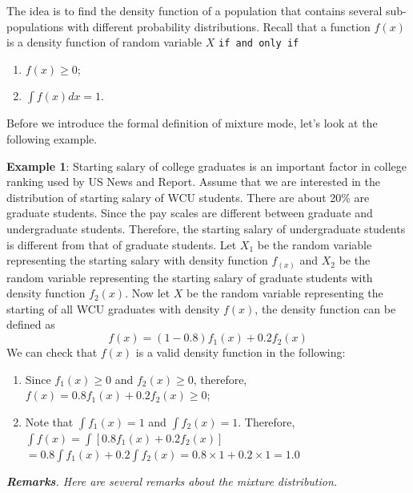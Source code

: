 \documentclass[
]{book}
\begin{document}
The idea is to find the density function of a population that contains several sub-populations with different probability distributions. Recall that a function \(f(x)\) is a density function of random variable \(X\) \texttt{if\ and\ only\ if}

\begin{enumerate}
\def\labelenumi{\arabic{enumi}.}
\item
  \(f(x) \ge 0\);
\item
  \(\int f(x) dx = 1.\)
\end{enumerate}

Before we introduce the formal definition of mixture mode, let's look at the following example.

\textbf{Example 1}: Starting salary of college graduates is an important factor in college ranking used by US News and Report. Assume that we are interested in the distribution of starting salary of WCU students. There are about 20\% are graduate students. Since the pay scales are different between graduate and undergraduate students. Therefore, the starting salary of undergraduate students is different from that of graduate students. Let \(X_1\) be the random variable representing the starting salary with density function \(f_(x)\) and \(X_2\) be the random variable representing the starting salary of graduate students with density function \(f_2(x)\). Now let \(X\) be the random variable representing the starting of all WCU graduates with density \(f(x)\), the density function can be defined as
\[
f(x) = (1-0.8)f_1(x) + 0.2f_2(x)
\]
We can check that \(f(x)\) is a valid density function in the following:

\begin{enumerate}
\def\labelenumi{\arabic{enumi}.}
\item
  Since \(f_1(x) \ge 0\) and \(f_2(x) \ge 0\), therefore, \(f(x) = 0.8f_1(x) + 0.2f_2(x) \ge 0\);
\item
  Note that \(\int f_1(x) = 1\) and \(\int f_2(x) = 1\). Therefore, \(\int f(x) = \int [0.8 f_1(x) + 0.2f_2(x)]\) \(= 0.8\int f_1(x) + 0.2 \int f_2(x) = 0.8\times 1 + 0.2 \times 1 = 1.0\)
\end{enumerate}

\emph{\textbf{Remarks}. Here are several remarks about the mixture distribution.}
\end{document}
